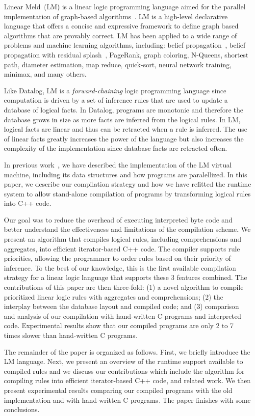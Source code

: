 Linear Meld~(LM) is a linear logic programming language aimed for the parallel
implementation of graph-based algorithms~\cite{cruz-iclp14}.  LM is a high-level
declarative language that offers a concise and expressive framework to define
graph based algorithms that are provably correct.  LM has been applied to a wide
range of problems and machine learning algorithms, including: belief
propagation~\cite{Gonzalez+al:aistats09paraml}, belief propagation with residual
splash~\cite{Gonzalez+al:aistats09paraml}, PageRank, graph coloring, N-Queens,
shortest path, diameter estimation, map reduce, quick-sort, neural network
training, minimax, and many others.

Like Datalog, LM is a \emph{forward-chaining} logic programming language since
computation is driven by a set of inference rules that are used to update a
database of logical facts.  In Datalog, programs are monotonic and therefore the
database grows in size as more facts are inferred from the logical rules. In LM,
logical facts are linear and thus can be retracted when a rule is inferred. The
use of linear facts greatly increases the power of the language but also
increases the complexity of the implementation since database facts are
retracted often.

In previous work~\cite{cruz-ppdp14}, we have described the implementation of the
LM virtual machine, including its data structures and how programs are
paralellized. In this paper, we describe our compilation strategy
and how we have refitted the runtime system to allow stand-alone compilation of
programs by transforming logical rules into C++ code.

Our goal was to reduce the overhead of executing interpreted byte code and
better understand the effectiveness and limitations of the compilation scheme.
We present an algorithm that compiles logical rules, including comprehensions
and aggregates, into efficient iterator-based C++ code.  The compiler supports
rule priorities, allowing the programmer to order rules based on their priority
of inference. To the best of our knowledge, this is the first available
compilation strategy for a linear logic language that supports these 3 features
combined. The contributions of this paper are then three-fold: (1) a novel
algorithm to compile prioritized linear logic rules with aggregates and
comprehensions; (2) the interplay between the database layout and compiled code;
and (3) comparison and analysis of our compilation with hand-written C programs
and interpreted code.  Experimental results show that our compiled programs are
only 2 to 7 times slower than hand-written C programs.

The remainder of the paper is organized as follows. First, we briefly introduce
the LM language. Next, we present an overview of the runtime support available
to compiled rules and we discuss our contributions which include the algorithm
for compiling rules into efficient iterator-based C++ code, and related work. We
then present experimental results comparing our compiled programs with the old
implementation and with hand-written C programs.  The paper finishes with some
conclusions.

